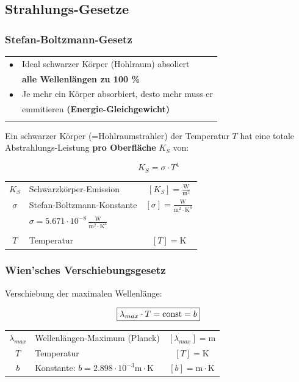 \subsection{Strahlungs-Gesetze}


\subsubsection{Stefan-Boltzmann-Gesetz}

\begin{tabular}{ll}
$\bullet$ & Ideal schwarzer Körper (Hohlraum) absoliert  \\
		  & \textbf{alle Wellenlängen zu 100 \%}   \\		
$\bullet$ & Je mehr ein Körper absorbiert, desto mehr muss er \\
		  & emmitieren \textbf{(Energie-Gleichgewicht)}   \\	
		  \\
\end{tabular}

Ein schwarzer Körper (=Hohlraumstrahler) der Temperatur $T$ hat eine totale Abstrahlungs-Leistung \textbf{pro Oberfläche} $K_S$ von: 

$$ \boxed{ K_S = \sigma \cdot T^4 }  $$



\begin{tabular}{c l c}
	\rule{0pt}{10pt}$K_S$ & Schwarzkörper-Emission & $[K_S] = \mathrm{\frac{W}{m^2}}$ \\
	\rule{0pt}{10pt}$\sigma$ & Stefan-Boltzmann-Konstante  & $[\sigma] = \mathrm{\frac{W}{m^2 \cdot K^4}}$\\
	\rule{0pt}{10pt}&  $\sigma = 5.671 \cdot 10^{-8} \, \mathrm{\frac{W}{m^2 \cdot K^4}}$ &  \\ \\
	$T$ & Temperatur & $[T] = \mathrm{K}$ \\
\end{tabular}




\subsubsection{Wien'sches Verschiebungsgesetz}

Verschiebung der maximalen Wellenlänge:

$$ \boxed{ \lambda_{max} \cdot T = \mathrm{const} = b  }  $$

\begin{tabular}{c l c}
	$\lambda_{max}$ & Wellenlängen-Maximum (Planck) & $[\lambda_{max}] = \mathrm{m}$ \\
	$T$ & Temperatur & $[T] = \mathrm{K}$ \\
	\rule{0pt}{8pt}$b$ & Konstante: $b = 2.898 \cdot 10^{-3} \mathrm{ m \cdot K}$ & $ [b] = \mathrm{ m \cdot K}$ \\
\end{tabular}





